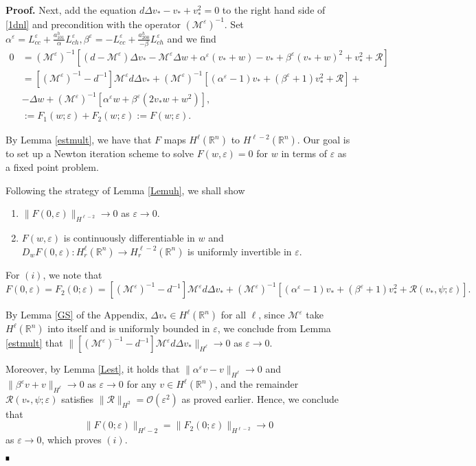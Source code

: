 \documentclass[letterpaper,11pt]{article}
\newcommand{\R}{\mathbb{R}}
\newcommand{\rmO}{\mathcal{O}}
\newcommand{\eps}{\varepsilon}
\newcommand{\Rm}{\mathcal{R}}
\newcommand{\M}{\mathcal{M}}
\numberwithin{equation}{section}
\theoremstyle{plain}
\theoremstyle{remark}
\newenvironment{Proof}[1][.]%
 {\begin{trivlist}\item[]\textbf{Proof#1 }}%
 {\hspace*{\fill}$\rule{0.3\baselineskip}{0.35\baselineskip}$\end{trivlist}}
\begin{document}
\begin{Proof}
Next, add the equation $d\Delta v_*-v_*+v_*^2 =0$ to the right hand side of \eqref{1dnl} and precondition with the operator $(\M^{\eps})^{-1}$. Set $\alpha^\eps = L_{cc}^\eps + \frac{a_{101}^h}{\alpha} L_{ch}^\eps , \beta^\eps=-L_{cc}^\eps +\frac{a_{200}^h}{-\beta} L_{ch}^\eps $ and we find
\begin{eqnarray}
0 &=(\M^\eps)^{-1}\left[ (d-\M^\eps)\Delta v_* -\M^\eps \Delta w+\alpha^\eps(v_*+w)-v_*+\beta^\eps(v_*+w)^2+v_*^2 + \Rm \right] \nonumber \\ 
&= [(\M^{\eps})^{-1}-d^{-1}]\M^\eps d\Delta v_*+(\M^{\eps})^{-1}\left[ (\alpha^\eps-1)v_*+(\beta^\eps+1)v_*^2+\Rm \right]+ \nonumber \\
&-\Delta w+(\M^{\eps})^{-1}\left[\alpha^\eps w+\beta^\eps(2v_*w+w^2)\right], \nonumber \\
&:= F_1(w;\eps)+F_2(w;\eps):= F(w;\eps).  \label{splfynl}
\end{eqnarray}

By Lemma \ref{estmult}, we have that $F$ maps $H^\ell(\R^n)$ to $H^{\ell-2}(\R^n)$. Our goal is to set up a Newton iteration scheme to solve $ F(w,\eps) =0$ for $w$ in terms of $\eps$ as a fixed point problem.

Following the strategy of Lemma \ref{Lemuh}, we shall show
\begin{enumerate}
\item $\|F(0,\eps)\|_{H^{\ell-2}} \to 0$ as $\eps \to 0$.
\item $F(w,\eps)$ is continuously differentiable in $w$ and $D_wF(0,\eps): H^{\ell}_{r}(\R^n) \to H^{\ell-2}_{r}(\R^n)$ is uniformly invertible in $\eps$.
\end{enumerate}
For $(i)$, we note that
\[
F(0,\eps) = F_2(0;\eps) = [(\M^{\eps})^{-1}-d^{-1}]\M^\eps d \Delta v_*+(\M^\eps)^{-1}[(\alpha^\eps-1)v_*+(\beta^\eps+1)v_*^2+\Rm(v_*,\psi;\eps)].
\]

By Lemma \ref{GS} of the Appendix, $\Delta v_* \in H^\ell(\R^n)$ for all $\ell$, since $\M^\eps$ take $H^\ell(\R^n)$ into itself and is uniformly bounded in $\eps$, we conclude from Lemma \ref{estmult} that 
$\|[(\M^{\eps})^{-1}-d^{-1}]\M^\eps d \Delta v_* \|_{H^\ell} \to 0$
as $\eps \to 0$.

Moreover, by Lemma \ref{Lest}, it holds that $\| \alpha^\eps v -v\|_{H^\ell} \to 0$ and $\| \beta^\eps v + v\|_{H^\ell} \to 0$ as $\eps \to 0$ for any $v \in H^\ell(\R^n)$, and the remainder $\Rm(v_*,\psi;\eps)$ satisfies $\|\Rm\|_{H^2} = \rmO(\eps^2)$ as proved earlier. Hence, we conclude that 
\[
\| F(0;\eps)\|_{H^\ell-2} = \| F_2(0;\eps)\|_{H^{\ell-2} }\to 0
\]
as $\eps \to 0$, which proves $(i)$.


\end{Proof}
\end{document}
